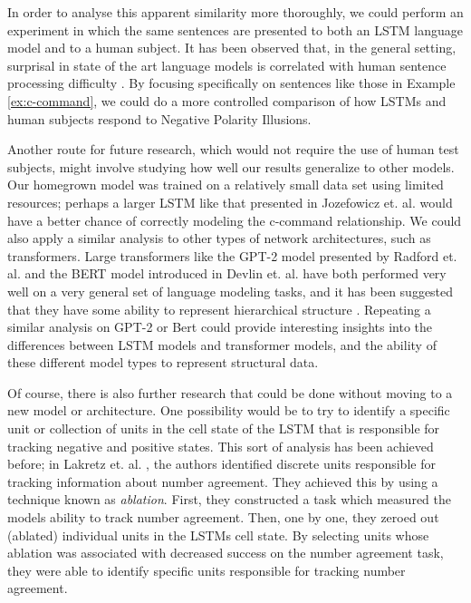 \documentclass[11pt, round]{article}
\begin{document}
In order to analyse this apparent similarity more thoroughly, we could perform an experiment in which the same sentences are presented to both an LSTM language model and to a human subject. It has been observed that, in the general setting, surprisal in state of the art language models is correlated with human sentence processing difficulty \cite{hale2001probabilistic,levy2008expectation,smith2013effect}. By focusing specifically on sentences like those in Example \ref{ex:c-command}, we could do a more controlled comparison of how LSTMs and human subjects respond to Negative Polarity Illusions.

Another route for future research, which would not require the use of human test subjects, might involve studying how well our results generalize to other models. Our homegrown model was trained on a relatively small data set using limited resources; perhaps a larger LSTM like that presented in Jozefowicz et. al.  would have a better chance of correctly modeling the c-command relationship. We could also apply a similar analysis to other types of network architectures, such as transformers. Large transformers like the GPT-2 model presented by Radford et. al.  and the BERT model introduced in Devlin et. al.  have both performed very well on a very general set of language modeling tasks, and it has been suggested that they have some ability to represent hierarchical structure \cite{jawahar2019does,clark2019does}. Repeating a similar analysis on GPT-2 or Bert could provide interesting insights into the differences between LSTM models and transformer models, and the ability of these different model types to represent structural data.

Of course, there is also further research that could be done without moving to a new model or architecture. One possibility would be to try to identify a specific unit or collection of units in the cell state of the LSTM that is responsible for tracking negative and positive states. This sort of analysis has been achieved before; in Lakretz et. al. , the authors identified discrete units responsible for tracking information about number agreement. They achieved this by using a technique known as \textit{ablation}. First, they constructed a task which measured the models ability to track number agreement. Then, one by one, they zeroed out (ablated) individual units in the LSTMs cell state. By selecting units whose ablation was associated with decreased success on the number agreement task, they were able to identify specific units responsible for tracking number agreement.
\end{document}
